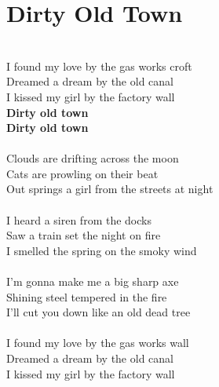 \documentclass[letterpaper,14pt]{extarticle}
\begin{document}
\section{Dirty Old Town}
\noindent
\\I found my love by the gas works croft
\\Dreamed a dream by the old canal
\\I kissed my girl by the factory wall
\\\textbf{Dirty old town}
\\\textbf{Dirty old town}
\\
\\Clouds are drifting across the moon
\\Cats are prowling on their beat
\\Out springs a girl from the streets at night
\\
\\I heard a siren from the docks
\\Saw a train set the night on fire
\\I smelled the spring on the smoky wind
\\
\\I'm gonna make me a big sharp axe
\\Shining steel tempered in the fire
\\I'll cut you down like an old dead tree
\\
\\I found my love by the gas works wall
\\Dreamed a dream by the old canal
\\I kissed my girl by the factory wall
\end{document}
